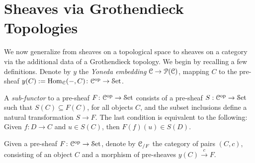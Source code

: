 \documentclass[10pt]{amsart}
\begin{document}
	\section{Sheaves via Grothendieck Topologies}
	
	We now generalize from sheaves on a topological space to sheaves on a category via the additional data of a Grothendieck topology. We begin by recalling a few definitions. Denote by $y$ the \textit{Yoneda embedding} $\mathcal{C}\to\mathcal{P}(\mathcal{C})$, mapping $C$ to the pre-sheaf $y(C):=\mathrm{Hom}_{\mathcal{C}}(-,C)\colon\mathcal{C}^{\mathrm{op}}\to\mathcal{S}\mathrm{et}$. 
	\begin{definition}
		A \emph{sub-functor} to a pre-sheaf $F\colon\mathcal{C}^{\mathrm{op}}\to\mathcal{S}\mathrm{et}$ consists of a pre-sheaf $S:\mathcal{C}^{\mathrm{op}}\to\mathcal{S}\mathrm{et}$ such that $S(C)\subseteq F(C)$, for all objects $C$, and the subset inclusions define a natural transformation $S\to F$. The last condition is equivalent to the following: Given $f\colon D\to C$ and $u\in S(C)$, then $F(f)(u)\in S(D)$. 
	\end{definition}
	\begin{definition}
		Given a pre-sheaf $F\colon\mathcal{C}^{\mathrm{op}}\to\mathcal{S}\mathrm{et}$, denote by $\mathcal{C}_{/F}$ the category of pairs $(C,c)$, consisting of an object $C$ and a morphism of pre-sheaves $y(C)\xrightarrow{c} F$.
	\end{definition}
	
\end{document}
